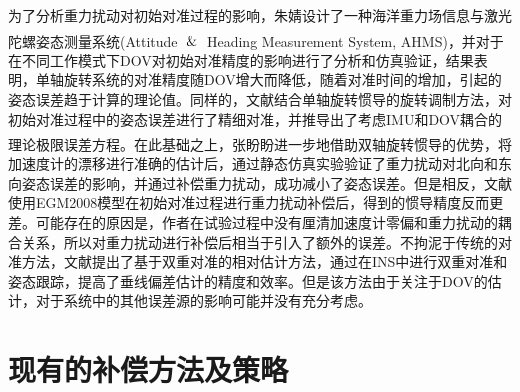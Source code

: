 \documentclass[12pt,a4,utf8]{article}
\newcommand{\upcite}[1]{\textsuperscript{\textsuperscript{\cite{#1}}}} %
\begin{document}
为了分析重力扰动对初始对准过程的影响，朱婧设计了一种海洋重力场信息与激光陀螺姿态测量系统(Attitude $\And$ Heading Measurement System, AHMS)\upcite{1020386196.nh}，并对于在不同工作模式下DOV对初始对准精度的影响进行了分析和仿真验证，结果表明，单轴旋转系统的对准精度随DOV增大而降低，随着对准时间的增加，引起的姿态误差趋于计算的理论值。同样的，文献\cite{hao2022analysis}结合单轴旋转惯导的旋转调制方法，对初始对准过程中的姿态误差进行了精细对准，并推导出了考虑IMU和DOV耦合的理论极限误差方程。在此基础之上，张盼盼进一步地借助双轴旋转惯导的优势\upcite{zhang2023gravity}，将加速度计的漂移进行准确的估计后，通过静态仿真实验验证了重力扰动对北向和东向姿态误差的影响，并通过补偿重力扰动，成功减小了姿态误差。但是相反，文献\cite{TIE2017impact}使用EGM2008模型在初始对准过程进行重力扰动补偿后，得到的惯导精度反而更差。可能存在的原因是，作者在试验过程中没有厘清加速度计零偏和重力扰动的耦合关系，所以对重力扰动进行补偿后相当于引入了额外的误差。不拘泥于传统的对准方法，文献\cite{hao2022analysis}提出了基于双重对准的相对估计方法，通过在INS中进行双重对准和姿态跟踪，提高了垂线偏差估计的精度和效率。但是该方法由于关注于DOV的估计，对于系统中的其他误差源的影响可能并没有充分考虑。

\section{现有的补偿方法及策略}
\end{document}
